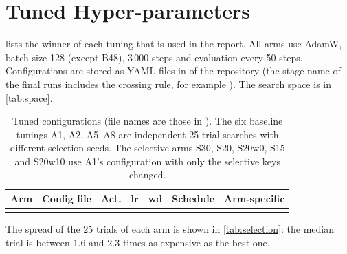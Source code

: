 \chapter{Tuned Hyper-parameters}\label{app:hyperparameters}
 lists the winner of each tuning that is used in the report. All arms use AdamW, batch size 128 (except B48), 3\,000 steps and evaluation every 50 steps. Configurations are stored as YAML files in  of the repository (the stage name of the final runs includes the crossing rule, for example ). The search space is in \cref{tab:space}.

\begin{table}[h]
\centering\footnotesize
\caption{Tuned configurations (file names are those in ). The six baseline tunings A1, A2, A5--A8 are independent 25-trial searches with different selection seeds. The selective arms S30, S20, S20w0, S15 and S20w10 use A1's configuration with only the selective keys changed.}
\label{tab:tuned}
\begin{tabular}{@{}l l l r r l p{4.6cm}@{}}
\toprule
Arm & Config file & Act. & lr & wd & Schedule & Arm-specific\\
\midrule
\\
\bottomrule
\end{tabular}
\end{table}

The spread of the 25 trials of each arm is shown in \cref{tab:selection}: the median trial is between $1.6$ and $2.3$ times as expensive as the best one.
